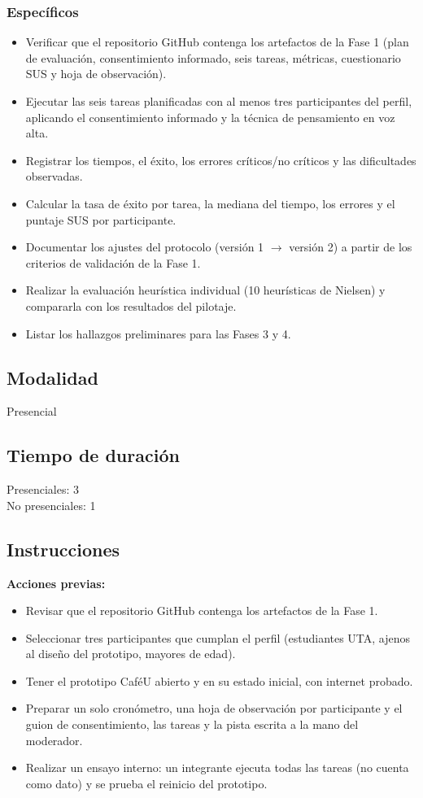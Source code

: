 \documentclass{article}
\begin{document}
\subsubsection{Específicos}
\begin{itemize}[leftmargin=1.5em, itemsep=2pt]
    \item Verificar que el repositorio GitHub contenga los artefactos de la Fase 1 (plan de evaluación, consentimiento informado, seis tareas, métricas, cuestionario SUS y hoja de observación).
    \item Ejecutar las seis tareas planificadas con al menos tres participantes del perfil, aplicando el consentimiento informado y la técnica de pensamiento en voz alta.
    \item Registrar los tiempos, el éxito, los errores críticos/no críticos y las dificultades observadas.
    \item Calcular la tasa de éxito por tarea, la mediana del tiempo, los errores y el puntaje SUS por participante.
    \item Documentar los ajustes del protocolo (versión 1 $\rightarrow$ versión 2) a partir de los criterios de validación de la Fase 1.
    \item Realizar la evaluación heurística individual (10 heurísticas de Nielsen) y compararla con los resultados del pilotaje.
    \item Listar los hallazgos preliminares para las Fases 3 y 4.
\end{itemize}

\subsection{Modalidad}
Presencial

\subsection{Tiempo de duración}
Presenciales: 3\\
No presenciales: 1

\subsection{Instrucciones}
\textbf{Acciones previas:}
\begin{itemize}[leftmargin=1.5em, itemsep=2pt]
    \item Revisar que el repositorio GitHub contenga los artefactos de la Fase 1.
    \item Seleccionar tres participantes que cumplan el perfil (estudiantes UTA, ajenos al diseño del prototipo, mayores de edad).
    \item Tener el prototipo CaféU abierto y en su estado inicial, con internet probado.
    \item Preparar un solo cronómetro, una hoja de observación por participante y el guion de consentimiento, las tareas y la pista escrita a la mano del moderador.
    \item Realizar un ensayo interno: un integrante ejecuta todas las tareas (no cuenta como dato) y se prueba el reinicio del prototipo.
\end{itemize}
\end{document}
